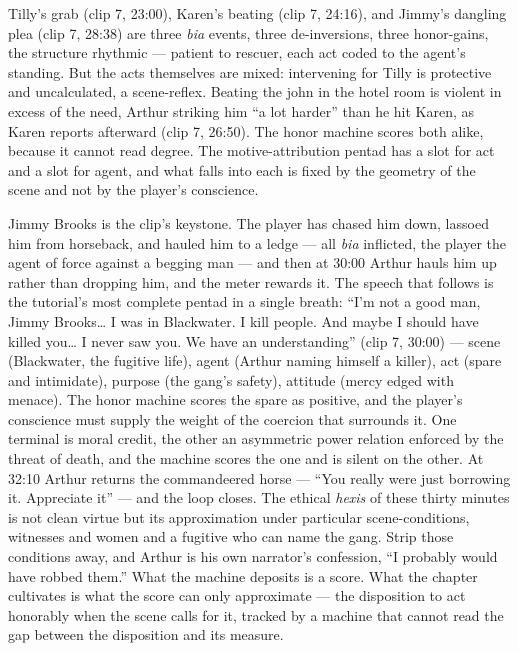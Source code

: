 \documentclass{article}
\begin{document}
Tilly's grab (clip 7, 23:00), Karen's beating (clip 7, 24:16), and Jimmy's dangling plea (clip 7, 28:38) are three \textit{bia} events, three de-inversions, three honor-gains, the structure rhythmic — patient to rescuer, each act coded to the agent's standing. But the acts themselves are mixed: intervening for Tilly is protective and uncalculated, a scene-reflex. Beating the john in the hotel room is violent in excess of the need, Arthur striking him ``a lot harder'' than he hit Karen, as Karen reports afterward (clip 7, 26:50). The honor machine scores both alike, because it cannot read degree. The motive-attribution pentad has a slot for act and a slot for agent, and what falls into each is fixed by the geometry of the scene and not by the player's conscience.

Jimmy Brooks is the clip's keystone. The player has chased him down, lassoed him from horseback, and hauled him to a ledge — all \textit{bia} inflicted, the player the agent of force against a begging man — and then at 30:00 Arthur hauls him up rather than dropping him, and the meter rewards it. The speech that follows is the tutorial's most complete pentad in a single breath: ``I'm not a good man, Jimmy Brooks… I was in Blackwater. I kill people. And maybe I should have killed you… I never saw you. We have an understanding'' (clip 7, 30:00) — scene (Blackwater, the fugitive life), agent (Arthur naming himself a killer), act (spare and intimidate), purpose (the gang's safety), attitude (mercy edged with menace). The honor machine scores the spare as positive, and the player's conscience must supply the weight of the coercion that surrounds it. One terminal is moral credit, the other an asymmetric power relation enforced by the threat of death, and the machine scores the one and is silent on the other. At 32:10 Arthur returns the commandeered horse — ``You really were just borrowing it. Appreciate it'' — and the loop closes. The ethical \textit{hexis} of these thirty minutes is not clean virtue but its approximation under particular scene-conditions, witnesses and women and a fugitive who can name the gang. Strip those conditions away, and Arthur is his own narrator's confession, ``I probably would have robbed them.'' What the machine deposits is a score. What the chapter cultivates is what the score can only approximate — the disposition to act honorably when the scene calls for it, tracked by a machine that cannot read the gap between the disposition and its measure.

\bigskip
\end{document}
